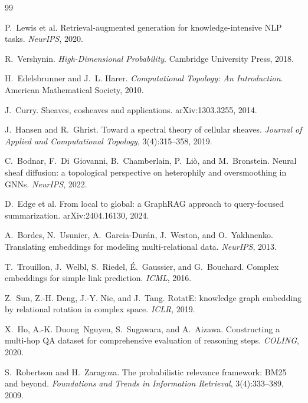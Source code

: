 \documentclass[11pt]{article}
\theoremstyle{definition}
\begin{document}
\begin{thebibliography}{99}

P.~Lewis et al.
\newblock Retrieval-augmented generation for knowledge-intensive NLP tasks.
\newblock \emph{NeurIPS}, 2020.

R.~Vershynin.
\newblock \emph{High-Dimensional Probability}.
\newblock Cambridge University Press, 2018.

H.~Edelsbrunner and J.~L. Harer.
\newblock \emph{Computational Topology: An Introduction}.
\newblock American Mathematical Society, 2010.

J.~Curry.
\newblock Sheaves, cosheaves and applications.
\newblock arXiv:1303.3255, 2014.

J.~Hansen and R.~Ghrist.
\newblock Toward a spectral theory of cellular sheaves.
\newblock \emph{Journal of Applied and Computational Topology}, 3(4):315--358, 2019.

C.~Bodnar, F.~Di~Giovanni, B.~Chamberlain, P.~Liò, and M.~Bronstein.
\newblock Neural sheaf diffusion: a topological perspective on heterophily and
oversmoothing in GNNs.
\newblock \emph{NeurIPS}, 2022.

D.~Edge et al.
\newblock From local to global: a GraphRAG approach to query-focused summarization.
\newblock arXiv:2404.16130, 2024.

A.~Bordes, N.~Usunier, A.~Garcia-Durán, J.~Weston, and O.~Yakhnenko.
\newblock Translating embeddings for modeling multi-relational data.
\newblock \emph{NeurIPS}, 2013.

T.~Trouillon, J.~Welbl, S.~Riedel, É.~Gaussier, and G.~Bouchard.
\newblock Complex embeddings for simple link prediction.
\newblock \emph{ICML}, 2016.

Z.~Sun, Z.-H. Deng, J.-Y. Nie, and J.~Tang.
\newblock RotatE: knowledge graph embedding by relational rotation in complex space.
\newblock \emph{ICLR}, 2019.

X.~Ho, A.-K. Duong~Nguyen, S.~Sugawara, and A.~Aizawa.
\newblock Constructing a multi-hop QA dataset for comprehensive evaluation of reasoning
steps.
\newblock \emph{COLING}, 2020.

S.~Robertson and H.~Zaragoza.
\newblock The probabilistic relevance framework: BM25 and beyond.
\newblock \emph{Foundations and Trends in Information Retrieval}, 3(4):333--389, 2009.

\end{thebibliography}
\end{document}
